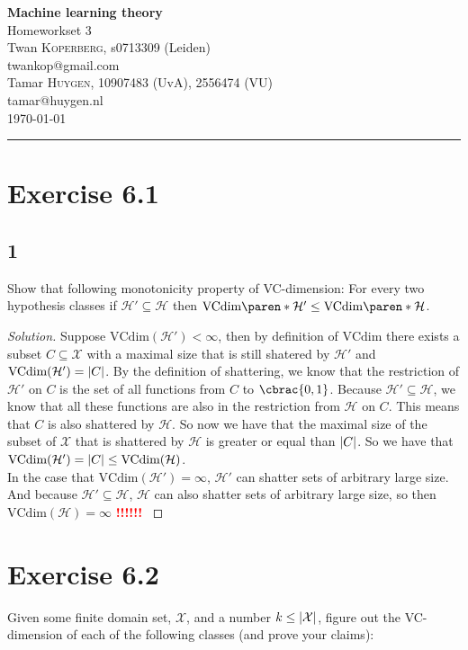 \documentclass[10pt, a4paper, twoside]{amsart}
\makeatletter
\DeclarePairedDelimiter\abs{\lvert}{\rvert}
\DeclarePairedDelimiter\cbrac\{\}
\DeclarePairedDelimiter\paren()
\newcommand{\cH}{\ensuremath{\mathcal{H}}}
\newcommand{\cX}{\ensuremath{\mathcal{X}}}
\newenvironment{solution}
               {\let\oldqedsymbol=\qedsymbol
                \renewcommand{\qedsymbol}{$\blacktriangleleft$}
                \begin{proof}[Solution]}
               {\end{proof}
                \renewcommand{\qedsymbol}{\oldqedsymbol}}
\newcommand{\TODO}{\textcolor{red}{\textbf{!!!!!! }}}
\newcommand{\firstName}  {Twan}
\newcommand{\lastName}   {Koperberg}
\newcommand{\studId}     {0713309 (Leiden)}
\renewcommand{\email}    {twankop@gmail.com}
\newcommand{\firstNameII}  {Tamar}
\newcommand{\lastNameII}   {Huygen}
\newcommand{\studIdII}     {10907483 (UvA)}
\newcommand{\studIdIII}    {2556474 (VU)}
\newcommand{\emailII}     {tamar@huygen.nl}
\makeatother
\begin{document}
\begin{center}

  {\huge\bf Machine learning theory}\\
  {\large\sc Homeworkset 3 }\\ \vspace{1em}
  \firstName \textsc{ \lastName}, {\sc s}\studId \\
  \email\text{}\\ \smallskip
  \firstNameII \textsc{ \lastNameII}, \studIdII, \studIdIII\\
  \emailII \\ \bigskip
  \today \\\bigskip
  \hrule
  \bigskip
 \end{center}

\section*{Exercise 6.1}
\subsection*{1}
Show that following monotonicity property of VC-dimension: For every two hypothesis classes if $\cH' \subseteq \cH$ then $\text{VCdim}\paren*{\cH'}\leq \text{VCdim}\paren*{\cH}$.
\begin{solution}
  Suppose $\text{VCdim}(\cH') < \infty$, then by definition of $\text{VCdim}$ there exists a subset $C \subseteq \cX$ with a maximal size that is still shatered by $\cH'$ and $\text{VCdim}(\cH') = \abs{C}$. By the definition of shattering, we know that the restriction of $\cH'$ on $C$ is the set of all functions from $C$ to $\cbrac{0,1}$. Because $\cH' \subseteq \cH$, we know that all these functions are also in the restriction from $\cH$ on $C$. This means that $C$ is also shattered by $\cH$. So now we have that the maximal size of the subset of $\cX$ that is shattered by $\cH$ is greater or equal than $\abs{C}$. So we have that $\text{VCdim}(\cH') = \abs{C} \leq \text{VCdim}(\cH)$. \\
  In the case that $\text{VCdim}(\cH') = \infty$, $\cH'$ can shatter sets of arbitrary large size. And because $\cH' \subseteq \cH$, $\cH$ can also shatter sets of arbitrary large size, so then  $\text{VCdim}(\cH ) = \infty$
 \TODO
\end{solution}
\section*{Exercise 6.2}
Given some finite domain set, $\cX$, and a number $k \leq \abs{\cX}$, figure out the VC-dimension of each of the following classes (and prove your claims):
\end{document}
